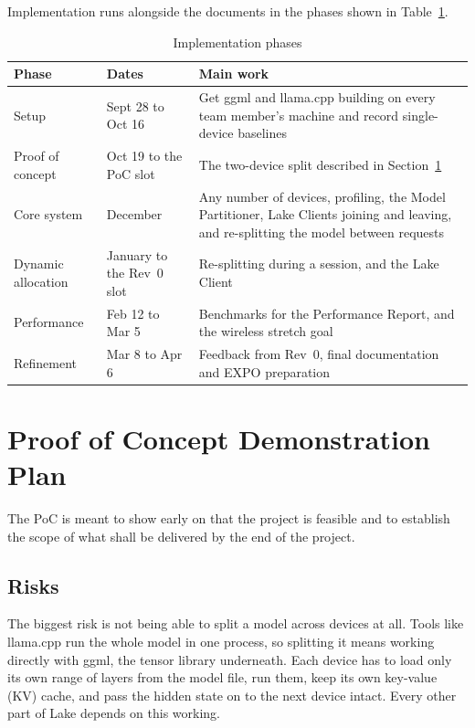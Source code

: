 \documentclass{article}
\begin{document}
Implementation runs alongside the documents in the phases shown in
Table~\ref{TblPhases}. 

\begin{table}[!htbp]
\centering
\caption{Implementation phases}
\label{TblPhases}
\small
\renewcommand{\arraystretch}{1.2}
\begin{tabularx}{\textwidth}{>{\raggedright\arraybackslash}p{2.6cm}%
>{\raggedright\arraybackslash}p{3.1cm}>{\raggedright\arraybackslash}X}
\toprule
\textbf{Phase} & \textbf{Dates} & \textbf{Main work}\\
\midrule
Setup & Sept 28 to Oct 16 & Get ggml and llama.cpp building on every team
  member's machine and record single-device baselines\\
Proof of concept & Oct 19 to the PoC slot & The two-device split described in
  Section~\ref{SecPoC}\\
Core system & December & Any number of devices, profiling, the Model
  Partitioner, Lake Clients joining and leaving, and re-splitting the model
  between requests\\
Dynamic allocation & January to the Rev~0 slot & Re-splitting during a
  session, and the Lake Client\\
Performance & Feb 12 to Mar 5 & Benchmarks for the Performance Report, and
  the wireless stretch goal\\
Refinement & Mar 8 to Apr 6 & Feedback from Rev~0, final documentation and
  EXPO preparation\\
\bottomrule
\end{tabularx}
\end{table}

\FloatBarrier

\section{Proof of Concept Demonstration Plan}
\label{SecPoC}

The PoC is meant to show early on that the project is feasible and to establish the scope of what shall be delivered by the end of the project.

\subsection{Risks}

The biggest risk is not being able to split a model across devices at all.
Tools like llama.cpp run the whole model in one process, so splitting it means
working directly with ggml, the tensor library underneath. Each device has to
load only its own range of layers from the model file, run them, keep its own
key-value (KV) cache, and pass the hidden state on to the next device intact.
Every other part of Lake depends on this working.
\end{document}

